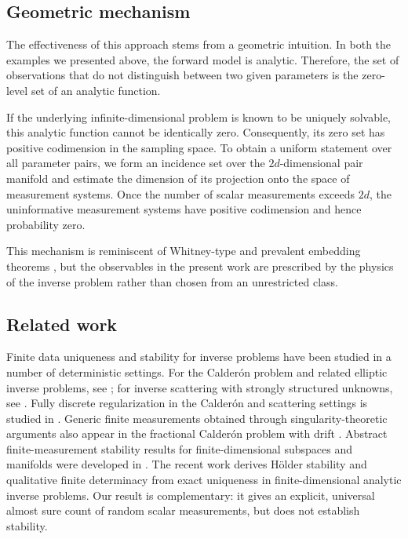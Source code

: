\documentclass[11pt,oneside]{amsart}
\theoremstyle{plain}
\theoremstyle{definition}
\theoremstyle{remark}
\begin{document}
\subsection{Geometric mechanism}
The effectiveness of this approach stems from a geometric intuition. In both the examples we presented above, the forward model is analytic. Therefore, the set of observations that do not distinguish between two given parameters is the zero-level set of an analytic function.

If the underlying infinite-dimensional problem is known to be uniquely solvable, this analytic function cannot be identically zero. Consequently, its zero set has positive codimension in the sampling space. To obtain a uniform statement over all parameter pairs, we form an incidence set over the $2d$-dimensional pair manifold and estimate the dimension of its projection onto the space of measurement systems. Once the number of scalar measurements exceeds $2d$, the uninformative measurement systems have positive codimension and hence probability zero.

This mechanism is reminiscent of Whitney-type and prevalent embedding theorems \cite{whitney1936}, but the observables in the present work are prescribed by the physics of the inverse problem rather than chosen from an unrestricted class.


\subsection{Related work}\label{sec:related-work}
Finite data uniqueness and stability for inverse problems have been studied in a number of deterministic settings. For the Calder\'on problem and related elliptic inverse problems, see \cite{alberti2019calderon,alberti2022calderon,harrach2019uniqueness,hanke2024lipschitz,ruland2019fractional,ruland2022runge}; for inverse scattering with strongly structured unknowns, see \cite{blaasten2020recovering,blaasten2021corners}. Fully discrete regularization in the Calder\'on and scattering settings is studied in \cite{felisi2024full,di2026discretization}. Generic finite measurements obtained through singularity-theoretic arguments also appear in the fractional Calder\'on problem with drift \cite{cekic2020calderon}. Abstract finite-measurement stability results for finite-dimensional subspaces and manifolds were developed in \cite{alberti2022infinite,alberti2022inverse}. The recent work \cite{carstea2026h} derives H\"older stability and qualitative finite determinacy from exact uniqueness in finite-dimensional analytic inverse problems. Our result is complementary: it gives an explicit, universal almost sure count of random scalar measurements, but does not establish stability. %
\end{document}
